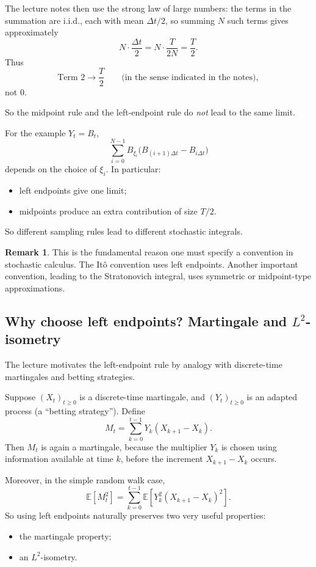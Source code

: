 \documentclass[11pt]{article}
\theoremstyle{definition}
\newtheorem{remark}[theorem]{Remark}
\begin{document}
The lecture notes then use the strong law of large numbers: the terms in the summation are i.i.d., each with mean \(\Delta t/2\), so summing \(N\) such terms gives approximately
\[
N\cdot \frac{\Delta t}{2}
=
N\cdot \frac{T}{2N}
=
\frac{T}{2}.
\]
Thus
\[
\text{Term 2}\to \frac{T}{2}
\qquad \text{(in the sense indicated in the notes)},
\]
not \(0\).

So the midpoint rule and the left-endpoint rule do \emph{not} lead to the same limit.

\begin{keyformula}
For the example \(Y_t=B_t\),
\[
\sum_{i=0}^{N-1} B_{\xi_i}\bigl(B_{(i+1)\Delta t}-B_{i\Delta t}\bigr)
\]
depends on the choice of \(\xi_i\). In particular:
\begin{itemize}[leftmargin=2em]
    \item left endpoints give one limit;
    \item midpoints produce an extra contribution of size \(T/2\).
\end{itemize}
So different sampling rules lead to different stochastic integrals.
\end{keyformula}

\begin{remark}
This is the fundamental reason one must specify a convention in stochastic calculus. The It\^o convention uses left endpoints. Another important convention, leading to the Stratonovich integral, uses symmetric or midpoint-type approximations.
\end{remark}

\subsection[Why choose left endpoints? Martingale and L2-isometry]{Why choose left endpoints? Martingale and \texorpdfstring{$L^2$}{L2}-isometry}

The lecture motivates the left-endpoint rule by analogy with discrete-time martingales and betting strategies.

Suppose \((X_t)_{t\ge 0}\) is a discrete-time martingale, and \((Y_t)_{t\ge 0}\) is an adapted process (a ``betting strategy''). Define
\[
M_t=\sum_{k=0}^{t-1}Y_k(X_{k+1}-X_k).
\]
Then \(M_t\) is again a martingale, because the multiplier \(Y_k\) is chosen using information available at time \(k\), before the increment \(X_{k+1}-X_k\) occurs.

Moreover, in the simple random walk case,
\[
\mathbb E[M_t^2]
=
\sum_{k=0}^{t-1}\mathbb E\!\left[Y_k^2(X_{k+1}-X_k)^2\right].
\]
So using left endpoints naturally preserves two very useful properties:
\begin{itemize}[leftmargin=2em]
    \item the martingale property;
    \item an \(L^2\)-isometry.
\end{itemize}
\end{document}
